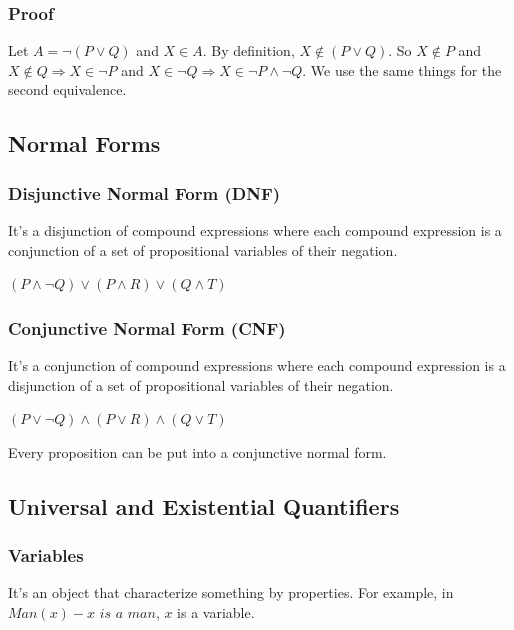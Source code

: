 \documentclass{article}
\begin{document}
\subsubsection{Proof}
\begin{tcolorbox}[width=12.1cm]
Let $ A = \neg(P \vee Q) $ and $ X \in A $. By definition, $ X \notin (P \vee Q) $. So $ X \notin P $ and $ X \notin Q \Rightarrow X \in \neg P $ and $ X \in \neg Q \Rightarrow X \in \neg P \wedge \neg Q $. We use the same things for the second equivalence.
\end{tcolorbox}

\subsection{Normal Forms}
\subsubsection{Disjunctive Normal Form (DNF)} It's a disjunction of compound expressions where each compound expression is a conjunction of a set of propositional variables of their negation.
\begin{center}
$ (P \wedge \neg Q) \vee (P \wedge R) \vee (Q \wedge T) $
\end{center}

\subsubsection{Conjunctive Normal Form (CNF)} It's a conjunction of compound expressions where each compound expression is a disjunction of a set of propositional variables of their negation.
\begin{center}
$ (P \vee \neg Q) \wedge (P \vee R) \wedge (Q \vee T) $
\end{center}

\begin{tcolorbox}[sharp corners, colback=green!30, colframe=green!80!blue, title=Theorem Of CNF]
Every proposition can be put into a conjunctive normal form.
\end{tcolorbox}

\subsection{Universal and Existential Quantifiers}
\subsubsection{Variables} It's an object that characterize something by properties. For example, in $ Man(x) - \textit{x is a man} $, $ x $ is a variable.
\end{document}
